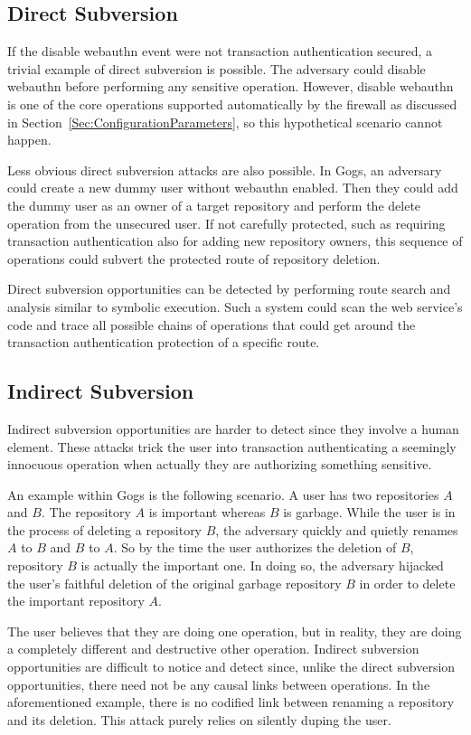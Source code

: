 \subsection{Direct Subversion}
If the disable webauthn event were not transaction authentication secured, a trivial example of direct subversion is possible. The adversary could disable webauthn before performing any sensitive operation. However, disable webauthn is one of the core operations supported automatically by the firewall as discussed in Section~\ref{Sec:ConfigurationParameters}, so this hypothetical scenario cannot happen.

Less obvious direct subversion attacks are also possible. In Gogs, an adversary could create a new dummy user without webauthn enabled. Then they could add the dummy user as an owner of a target repository and perform the delete operation from the unsecured user. If not carefully protected, such as requiring transaction authentication also for adding new repository owners, this sequence of operations could subvert the protected route of repository deletion.

Direct subversion opportunities can be detected by performing route search and analysis similar to symbolic execution. Such a system could scan the web service's code and trace all possible chains of operations that could get around the transaction authentication protection of a specific route.

\subsection{Indirect Subversion}
Indirect subversion opportunities are harder to detect since they involve a human element. These attacks trick the user into transaction authenticating a seemingly innocuous operation when actually they are authorizing something sensitive. 

An example within Gogs is the following scenario. A user has two repositories $A$ and $B$. The repository $A$ is important whereas $B$ is garbage. While the user is in the process of deleting a repository $B$, the adversary quickly and quietly renames $A$ to $B$ and $B$ to $A$. So by the time the user authorizes the deletion of $B$, repository $B$ is actually the important one. In doing so, the adversary hijacked the user's faithful deletion of the original garbage repository $B$ in order to delete the important repository $A$. 

The user believes that they are doing one operation, but in reality, they are doing a completely different and destructive other operation. Indirect subversion opportunities are difficult to notice and detect since, unlike the direct subversion opportunities, there need not be any causal links between operations. In the aforementioned example, there is no codified link between renaming a repository and its deletion. This attack purely relies on silently duping the user.

